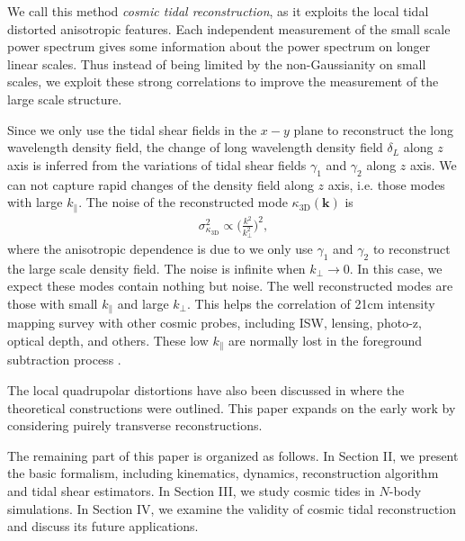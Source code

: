 \documentclass[aps,prd,twocolumn,showpacs,superscriptaddress,groupedaddress,nofootinbib]{revtex4}  %
\newcommand{\mr}{\mathrm}
\begin{document}
We call this method {\it cosmic tidal reconstruction}, as it exploits the
local tidal distorted anisotropic features.
Each independent measurement of the small scale power spectrum gives some 
information about the power spectrum on longer linear scales. 
Thus instead of being limited by the non-Gaussianity on small scales, we exploit these strong correlations to
improve the measurement of the large scale structure. 

Since we only use the tidal shear fields in the $x-y$ plane to reconstruct
the long wavelength density field, the change of long wavelength density
field $\delta_L$ along $z$ axis is inferred from the variations of tidal shear
fields $\gamma_1$ and $\gamma_2$ along $z$ axis.
We can not capture rapid changes of the density field along $z$ axis, 
i.e. those modes with large $k_\parallel$.
The noise of the reconstructed mode $\kappa_\mr{3D}(\bm{k})$ is 
\begin{eqnarray}
\sigma^2_{\kappa_\mr{3D}}\propto\bigg(\frac{k^2}{k_\perp^2}\bigg)^2,
\end{eqnarray}
where the anisotropic dependence is due to we only use $\gamma_{1}$ and 
$\gamma_2$ to reconstruct the large scale density field. 
The noise is infinite when $k_\perp\to0$. 
In this case, we expect these modes contain nothing but noise. 
The well reconstructed modes are those with small $k_\parallel$ and large
$k_\perp$. This helps the correlation of 21cm intensity mapping survey with
other cosmic probes, including ISW, lensing, photo-z, optical depth,
and others.  These low  $k_\parallel$ are normally lost in the
foreground subtraction process \cite{2007ApJ...660.1030F,2008MNRAS.384..291A}.


The local quadrupolar distortions have also been discussed in
\cite{masui2010,2012:jeong}
where the theoretical constructions were outlined.  This paper expands
on the early work by considering puirely transverse reconstructions.

The remaining part of this paper is organized as follows.
In Section II, we present the basic formalism, including kinematics, 
dynamics, reconstruction algorithm and tidal shear estimators. In Section III,
we study cosmic tides in $N$-body simulations. In Section IV,
we examine the validity of cosmic tidal reconstruction and discuss its 
future applications.
\end{document}
